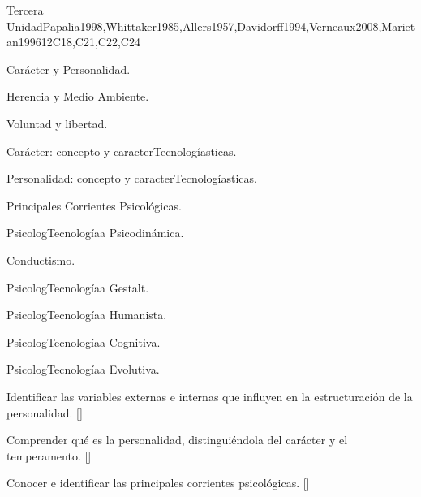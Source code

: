 \begin{syllabus}
\begin{unit}{}{Tercera Unidad}{Papalia1998,Whittaker1985,Allers1957,Davidorff1994,Verneaux2008,Marietan1996}{12}{C18,C21,C22,C24}
\begin{topics}
  \item Carácter y Personalidad.
    \begin{subtopics}
	\item Herencia y Medio Ambiente.
	\item Voluntad y libertad.
	\item Carácter: concepto y caracterTecnologíasticas.
	\item Personalidad: concepto y caracterTecnologíasticas.
    \end{subtopics}
  \item Principales Corrientes Psicológicas.
    \begin{subtopics}
	\item PsicologTecnologíaa Psicodinámica.
	\item Conductismo.
	\item PsicologTecnologíaa Gestalt.
	\item PsicologTecnologíaa Humanista.
	\item PsicologTecnologíaa Cognitiva.
	\item PsicologTecnologíaa Evolutiva.
    \end{subtopics}
\end{topics}
\begin{learningoutcomes}
	\item Identificar las variables externas e internas que influyen en la estructuración de la personalidad. [\Familiarity]
	\item Comprender qué es la personalidad, distinguiéndola del carácter y el temperamento. [\Familiarity]
	\item Conocer e identificar las principales corrientes psicológicas. [\Familiarity]
\end{learningoutcomes}
\end{unit}



\begin{coursebibliography}
\end{coursebibliography}

\end{syllabus}
